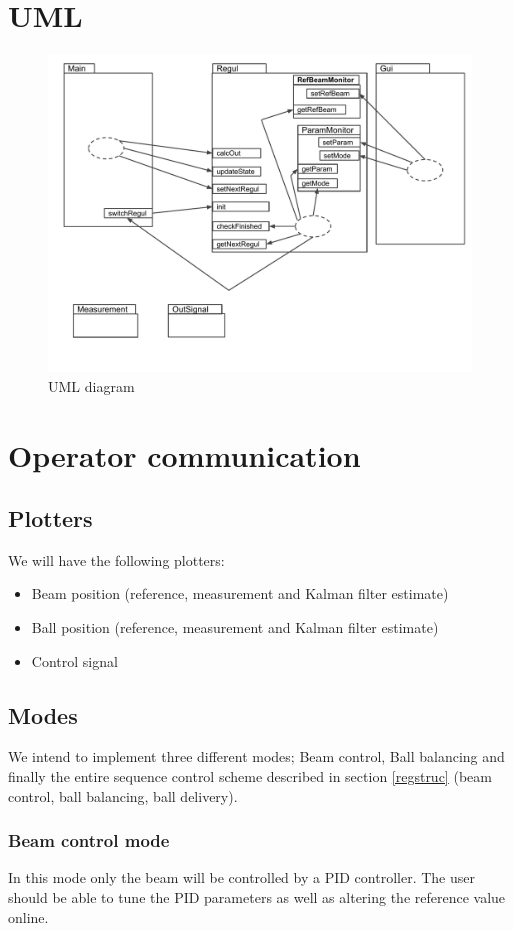 \documentclass{article}
\begin{document}
\section{UML}
\begin{figure}[htbp]
  \centering
  \includegraphics[width=\textwidth]{UML}
  \caption{UML diagram}\label{fig:UML}
\end{figure}

\section{Operator communication}
\subsection{Plotters}
We will have the following plotters:
\begin{itemize}
\item Beam position (reference, measurement and Kalman filter estimate)
\item Ball position (reference, measurement and Kalman filter estimate)
\item Control signal
\end{itemize}

\subsection{Modes}
We intend to implement three different modes; Beam control, Ball balancing and finally the entire sequence control scheme described in section \ref{regstruc} (beam control, ball balancing, ball delivery).
\subsubsection{Beam control mode}
In this mode only the beam will be controlled by a PID controller. The user should be able to tune the PID parameters as well as altering the reference value online.
\end{document}
